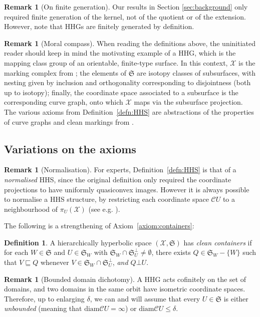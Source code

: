 \documentclass[svgnames]{amsart}
\theoremstyle{plain}
\theoremstyle{definition}
\newtheorem{defn}[thm]{Definition}
\newtheorem{rem}[thm]{Remark}
\newcommand{\cal}[1]{\mathcal{#1}}
\newcommand{\frakS}{\mathfrak{S}}
\newcommand{\C}{\cal C}
\newcommand{\diam}{\mathrm{diam}}
\newcommand{\nest}{\sqsubseteq}
\newcommand{\orth}{\bot}
\begin{document}
\begin{rem}[On finite generation]
    Our results in Section \ref{sec:background} only required finite generation of the kernel, not of the quotient or of the extension. However, note that HHGs are finitely generated by definition.
\end{rem}


\begin{rem}[Moral compass]
    When reading the definitions above, the uninitiated reader should keep in mind the motivating example of a HHG, which is the mapping class group of an orientable, finite-type surface. In this context, $\cal X$ is the marking complex from \cite[Section 2.5]{masurminsky2}; the elements of $\frakS$ are isotopy classes of subsurfaces, with nesting given by inclusion and orthogonality corresponding to disjointness (both up to isotopy); finally, the coordinate space associated to a subsurface is the corresponding curve graph, onto which $\cal X$ maps via the subsurface projection. The various axioms from Definition~\ref{defn:HHS} are abstractions of the properties of curve graphs and clean markings from \cite{masurminsky1,masurminsky2}.
\end{rem}


\subsection{Variations on the axioms}
\begin{rem}[Normalisation] 
    For experts, Definition~\ref{defn:HHS} is that of a \emph{normalised} HHS, since the original definition \cite{HHS_II} only required the coordinate projections to have uniformly quasiconvex images. However it is always possible to normalise a HHS structure, by restricting each coordinate space $\C U$ to a neighbourhood of $\pi_U(\cal X)$ (see e.g. \cite[Remark 1.3]{HHS_II}).
\end{rem}

The following is a strengthening of Axiom~\ref{axiom:containers}:

\begin{defn}\label{def:CC}
    A hierarchically hyperbolic space $(\cal X, \frakS)$ has \emph{clean containers} if for each $W \in \frakS$ and $U \in \frakS_W$ with $ \frakS_W\cap \frakS_U^\perp \neq \emptyset$, there exists $Q \in\frakS_W-\{W\}$ such that $V \nest Q$ whenever $V \in\frakS_W \cap \frakS_U^\perp$, \emph{and $Q\orth U$}.
\end{defn}

\begin{rem}[Bounded domain dichotomy]\label{rem:BDD}
A HHG acts cofinitely on the set of domains, and two domains in the same orbit have isometric coordinate spaces. Therefore, up to enlarging $\delta$, we can and will assume that every $U\in \frakS$ is either \emph{unbounded} (meaning that $\diam\C U=\infty$) or $\diam\C U\le \delta$. 
\end{rem}
\end{document}
